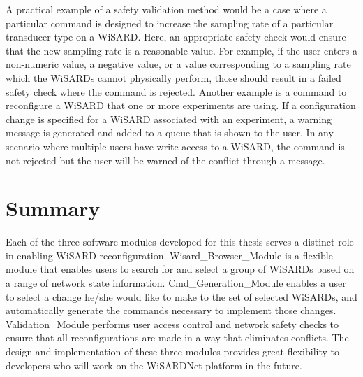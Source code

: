  A practical example of a safety validation method would be a case where a particular command is designed to increase the sampling rate of a particular transducer type on a WiSARD. Here, an appropriate safety check would ensure that the new sampling rate is a reasonable value. For example, if the user enters a non-numeric value, a negative value, or a value corresponding to a sampling rate which the WiSARDs cannot physically perform, those should result in a failed safety check where the command is rejected. Another example is a command to reconfigure a WiSARD that one or more experiments are using. If a configuration change is specified for a WiSARD associated with an experiment, a warning message is generated and added to a queue that is shown to the user. In any scenario where multiple users have write access to a WiSARD, the command is not rejected but the user will be warned of the conflict through a message. 

\section{Summary}
Each of the three software modules developed for this thesis serves a distinct role in enabling WiSARD reconfiguration. Wisard\_Browser\_Module is a flexible module that enables users to search for and select a group of WiSARDs based on a range of network state information. Cmd\_Generation\_Module enables a user to select a change he/she would like to make to the set of selected WiSARDs, and automatically generate the commands necessary to implement those changes. Validation\_Module performs user access control and network safety checks to ensure that all reconfigurations are made in a way that eliminates conflicts. The design and implementation of these three modules provides great flexibility to developers who will work on the WiSARDNet platform in the future.
